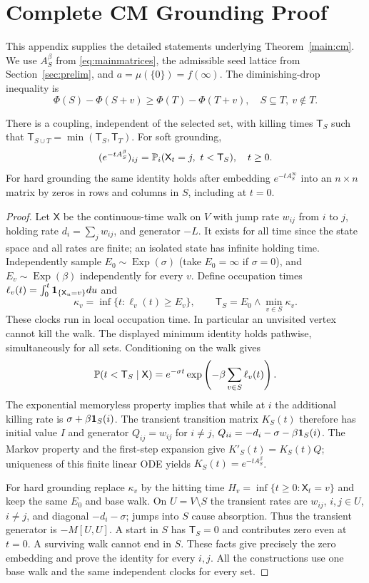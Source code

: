 \section{Complete CM Grounding Proof}\label{app:structure}

This appendix supplies the detailed statements underlying
Theorem~\ref{main:cm}. We use $A_S^\beta$ from
\eqref{eq:mainmatrices}, the admissible seed lattice from
Section~\ref{sec:prelim}, and $a=\mu(\{0\})=f(\infty)$.
The diminishing-drop inequality is
\begin{equation}\label{eq:super}
\Phi(S)-\Phi(S+v)\geq\Phi(T)-\Phi(T+v),\quad S\subseteq T,\ v\notin T.
\end{equation}
\begin{lemma}\label{lem:coupling}
There is a coupling, independent of the selected set, with killing times
$\mathsf T_S$ such that $\mathsf T_{S\cup T}=\min(\mathsf T_S,\mathsf T_T)$.
For soft grounding,
\[
 (e^{-tA_S^\beta})_{ij}=\Prob_i(\mathsf X_t=j,\ t<\mathsf T_S),\quad t\geq0.
\]
For hard grounding the same identity holds after embedding
$e^{-tA_S^\infty}$ into an $n\times n$ matrix by zeros in rows and
columns in $S$, including at $t=0$.
\end{lemma}
\begin{proof}
Let $\mathsf X$ be the continuous-time walk on $V$ with jump rate $w_{ij}$ from
$i$ to $j$, holding rate $d_i=\sum_j w_{ij}$, and generator $-L$.
It exists for all time since the state space and all rates are finite;
an isolated state has infinite holding time. Independently sample
$E_0\sim\operatorname{Exp}(\sigma)$ (take $E_0=\infty$ if $\sigma=0$),
and $E_v\sim\operatorname{Exp}(\beta)$ independently for every $v$.
Define occupation times $\ell_v(t)=\int_0^t\mathbf 1_{\{\mathsf X_u=v\}}du$ and
\[
 \kappa_v=\inf\{t:\ell_v(t)\geq E_v\},\qquad
 \mathsf T_S=E_0\wedge\min_{v\in S}\kappa_v.
\]
These clocks run in local occupation time. In particular an unvisited
vertex cannot kill the walk. The displayed minimum identity holds
pathwise, simultaneously for all sets. Conditioning on the walk gives
\[
 \mathbb P(t<\mathsf T_S\mid \mathsf X)=
 e^{-\sigma t}\exp\left(-\beta\sum_{v\in S}\ell_v(t)\right).
\]
The exponential memoryless property implies that while at $i$ the
additional killing rate is $\sigma+\beta\mathbf 1_S(i)$. The transient
transition matrix $K_S(t)$ therefore has initial value $I$ and generator
$Q_{ij}=w_{ij}$ for $i\ne j$, $Q_{ii}=-d_i-\sigma-\beta\mathbf 1_S(i)$.
The Markov property and the first-step expansion give $K'_S(t)=K_S(t)Q$;
uniqueness of this finite linear ODE yields $K_S(t)=e^{-tA_S^\beta}$.

For hard grounding replace $\kappa_v$ by the hitting time
$H_v=\inf\{t\geq0:\mathsf X_t=v\}$ and keep the same $E_0$ and base walk.
On $U=V\setminus S$ the transient rates are $w_{ij}$, $i,j\in U$, $i\ne j$,
and diagonal $-d_i-\sigma$; jumps into $S$ cause absorption.
Thus the transient generator is $-M[U,U]$. A start in $S$ has
$\mathsf T_S=0$ and contributes zero even at $t=0$. A surviving walk cannot
end in $S$. These facts give precisely the zero embedding and prove
the identity for every $i,j$. All the constructions use one base walk
and the same independent clocks for every set.
\end{proof}

